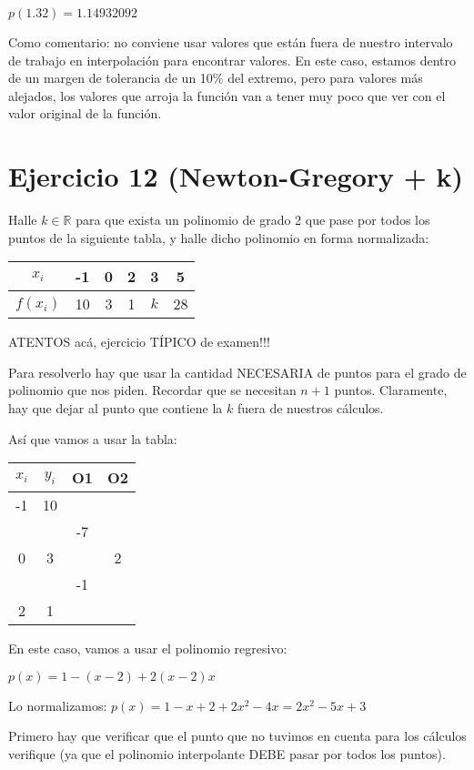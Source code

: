 \documentclass[11pt]{article}
\begin{document}
	$p(1.32)=1.14932092$
	
	Como comentario: no conviene usar valores que están fuera de nuestro intervalo de trabajo en interpolación para encontrar valores. En este caso, estamos dentro de un margen de tolerancia de un 10\% del extremo, pero para valores más alejados, los valores que arroja la función van a tener muy poco que ver con el valor original de la función.
	
	\section{Ejercicio 12 (Newton-Gregory + k)}
	Halle $k \in \mathbb{R}$ para que exista un polinomio de grado 2 que pase por todos los puntos de la siguiente tabla, y halle dicho polinomio en forma normalizada:
	
	\begin{center}
		\begin{tabular}{|c|c|c|c|c|c|}
		\hline
		$x_i$ & -1 & 0 & 2 & 3 & 5 \\
		\hline
		$f(x_i)$ & 10 & 3 & 1 & $k$ & 28 \\
		\hline
	\end{tabular}
	\end{center}

	ATENTOS acá, ejercicio TÍPICO de examen!!!
	
	Para resolverlo hay que usar la cantidad NECESARIA de puntos para el grado de polinomio que nos piden. Recordar que se necesitan $n+1$ puntos. Claramente, hay que dejar al punto que contiene la $k$ fuera de nuestros cálculos.
	
	Así que vamos a usar la tabla:
	
	\begin{tabular}{|c c c c|}
		\hline
		$x_i$ & $y_i$ & O1 & O2\\
		\hline
		-1 & 10 & & \\
		& & -7 & \\
		0  & 3  & &2 \\
		& & -1 & \\
		2  & 1 & & \\
		\hline
	\end{tabular}

	En este caso, vamos a usar el polinomio regresivo:
	
	$p(x)=1-(x-2)+2(x-2)x$
	
	Lo normalizamos: $p(x)=1-x+2+2x^2-4x=2x^2-5x+3$
	
	Primero hay que verificar que el punto que no tuvimos en cuenta para los cálculos verifique (ya que el polinomio interpolante DEBE pasar por todos los puntos).
	
\end{document}
